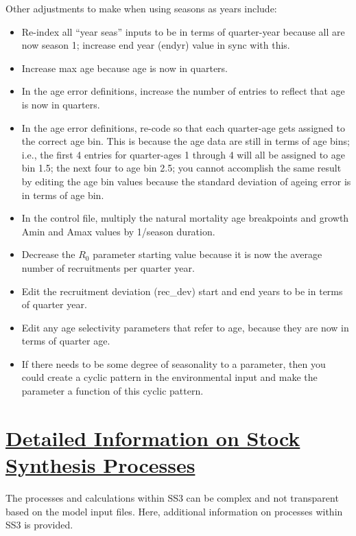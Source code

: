 Other adjustments to make when using seasons as years include:

\begin{itemize}
	\item Re-index all ``year seas'' inputs to be in terms of quarter-year because all are now season 1; increase end year (endyr) value in sync with this.
	\item Increase max age because age is now in quarters.
	\item In the age error definitions, increase the number of entries to reflect that age is now in quarters.
	\item In the age error definitions, re-code so that each quarter-age gets assigned to the correct age bin. This is because the age data are still in terms of age bins; i.e., the first 4 entries for quarter-ages 1 through 4 will all be assigned to age bin 1.5; the next four to age bin 2.5; you cannot accomplish the same result by editing the age bin values because the standard deviation of ageing error is in terms of age bin.
	\item In the control file, multiply the natural mortality age breakpoints and growth Amin and Amax values by 1/season duration.
	\item Decrease the $R_{0}$ parameter starting value because it is now the average number of recruitments per quarter year.
	\item Edit the recruitment deviation (rec\_dev) start and end years to be in terms of quarter year.
	\item Edit any age selectivity parameters that refer to age, because they are now in terms of quarter age.
	\item If there needs to be some degree of seasonality to a parameter, then you could create a cyclic pattern in the environmental input and make the parameter a function of this cyclic pattern.
\end{itemize}

\pagebreak

\hypertarget{SS3Processes}{}
\section[Detailed Information on Stock Synthesis Processes]{\protect\hyperlink{SS3Processes}{Detailed Information on Stock Synthesis Processes}}

The processes and calculations within SS3 can be complex and not transparent based on the model input files. Here, additional information on processes within SS3 is provided.

